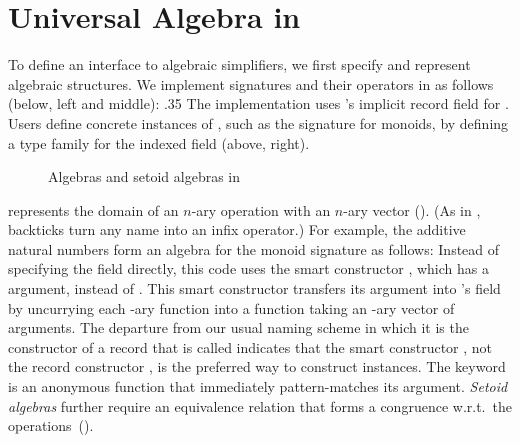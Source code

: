 \section{Universal Algebra in \Frexlib{}}
To define an interface to algebraic simplifiers, we first
specify and represent algebraic structures.
We implement signatures and their operators in \Frexlib{} as follows
(below, left and middle):
 {.35}{\MonoidOperationIntro{}}
The implementation uses \idris{}'s implicit record field for
\ArityName{}.  Users define concrete instances of \SignatureName{},
such as the signature \MonoidSig{} for monoids, by defining a
type family for the indexed field
\OpWithArityName{} (above, right).


\begin{figure}
\caption{Algebras and setoid algebras in \Frexlib{}}
\end{figure}


\Frexlib{} represents the domain of an $n$-ary operation
with an $n$-ary vector (). (As in
\Haskell{},
backticks turn any name into an infix operator.)  For
example, the additive natural numbers form
an algebra for the monoid
signature as follows:
Instead of specifying the  field directly,
this code uses the smart constructor ,
which has a  argument, instead of .
This smart constructor transfers its  argument into
's  field by uncurrying
each \nvar{}-ary function into a function taking an \nvar{}-ary vector of arguments.
The departure from our usual naming scheme in which it is the constructor of
a record  that is called  indicates that the
smart constructor , not the record constructor
,
is the preferred way to construct
 instances.
The  keyword is an anonymous
function that immediately pattern-matches its argument.  \emph{Setoid
  algebras} further require an equivalence relation that forms a
congruence w.r.t.~the operations~().


